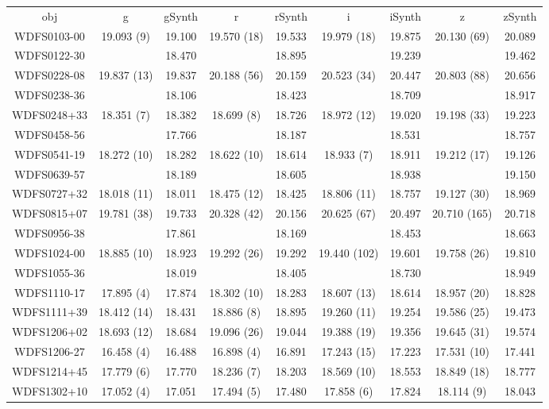 \begin{table}
\begin{tabular}{ccccccccc}
obj & g & gSynth & r & rSynth & i & iSynth & z & zSynth \\
WDFS0103-00 & 19.093 (9) & 19.100 & 19.570 (18) & 19.533 & 19.979 (18) & 19.875 & 20.130 (69) & 20.089 \\
WDFS0122-30 &  & 18.470 &  & 18.895 &  & 19.239 &  & 19.462 \\
WDFS0228-08 & 19.837 (13) & 19.837 & 20.188 (56) & 20.159 & 20.523 (34) & 20.447 & 20.803 (88) & 20.656 \\
WDFS0238-36 &  & 18.106 &  & 18.423 &  & 18.709 &  & 18.917 \\
WDFS0248+33 & 18.351 (7) & 18.382 & 18.699 (8) & 18.726 & 18.972 (12) & 19.020 & 19.198 (33) & 19.223 \\
WDFS0458-56 &  & 17.766 &  & 18.187 &  & 18.531 &  & 18.757 \\
WDFS0541-19 & 18.272 (10) & 18.282 & 18.622 (10) & 18.614 & 18.933 (7) & 18.911 & 19.212 (17) & 19.126 \\
WDFS0639-57 &  & 18.189 &  & 18.605 &  & 18.938 &  & 19.150 \\
WDFS0727+32 & 18.018 (11) & 18.011 & 18.475 (12) & 18.425 & 18.806 (11) & 18.757 & 19.127 (30) & 18.969 \\
WDFS0815+07 & 19.781 (38) & 19.733 & 20.328 (42) & 20.156 & 20.625 (67) & 20.497 & 20.710 (165) & 20.718 \\
WDFS0956-38 &  & 17.861 &  & 18.169 &  & 18.453 &  & 18.663 \\
WDFS1024-00 & 18.885 (10) & 18.923 & 19.292 (26) & 19.292 & 19.440 (102) & 19.601 & 19.758 (26) & 19.810 \\
WDFS1055-36 &  & 18.019 &  & 18.405 &  & 18.730 &  & 18.949 \\
WDFS1110-17 & 17.895 (4) & 17.874 & 18.302 (10) & 18.283 & 18.607 (13) & 18.614 & 18.957 (20) & 18.828 \\
WDFS1111+39 & 18.412 (14) & 18.431 & 18.886 (8) & 18.895 & 19.260 (11) & 19.254 & 19.586 (25) & 19.473 \\
WDFS1206+02 & 18.693 (12) & 18.684 & 19.096 (26) & 19.044 & 19.388 (19) & 19.356 & 19.645 (31) & 19.574 \\
WDFS1206-27 & 16.458 (4) & 16.488 & 16.898 (4) & 16.891 & 17.243 (15) & 17.223 & 17.531 (10) & 17.441 \\
WDFS1214+45 & 17.779 (6) & 17.770 & 18.236 (7) & 18.203 & 18.569 (10) & 18.553 & 18.849 (18) & 18.777 \\
WDFS1302+10 & 17.052 (4) & 17.051 & 17.494 (5) & 17.480 & 17.858 (6) & 17.824 & 18.114 (9) & 18.043 \\

\end{tabular}
\end{table}
